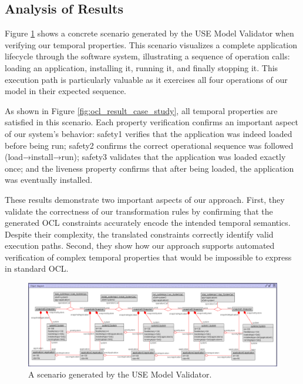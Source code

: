 \subsection{Analysis of Results}

\hspace{1cm} Figure \ref{fig:object_diagram_case_study} shows a concrete scenario 
generated by the USE Model Validator when verifying our temporal properties. This 
scenario visualizes a complete application lifecycle through the software system, 
illustrating a sequence of operation calls: loading an application, installing it, 
running it, and finally stopping it. This execution path is particularly valuable 
as it exercises all four operations of our model in their expected sequence.

As shown in Figure \ref{fig:ocl_result_case_study}, all temporal properties are 
satisfied in this scenario. Each property verification confirms an important aspect 
of our system's behavior: safety1 verifies that the application was indeed loaded 
before being run; safety2 confirms the correct operational sequence was followed 
(load→install→run); safety3 validates that the application was loaded exactly once; 
and the liveness property confirms that after being loaded, the application was 
eventually installed.

These results demonstrate two important aspects of our approach. First, they validate 
the correctness of our transformation rules by confirming that the generated OCL 
constraints accurately encode the intended temporal semantics. Despite their 
complexity, the translated constraints correctly identify valid execution paths. 
Second, they show how our approach supports automated verification of complex 
temporal properties that would be impossible to express in standard OCL.

\begin{figure}
    \centering
    \includegraphics[width=1\textwidth]{figures/c3/CaseStudy_ObjectDiagram.png}
    \caption{A scenario generated by the USE Model Validator.}
    \label{fig:object_diagram_case_study}
\end{figure}

